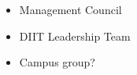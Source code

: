 \begin{itemize}

\item Management Council
\item DIIT Leadership Team
\item Campus group?
\end{itemize}